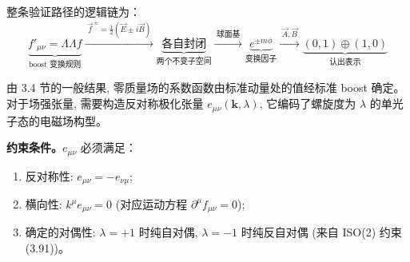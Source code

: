 整条验证路径的逻辑链为：
\begin{equation*}
    \underbrace{f'_{\mu\nu}=\Lambda\Lambda f}_{\text{boost 变换规则}}
    \xrightarrow{\;\vec{f}^{\,\pm}=\frac{1}{2}(\vec{E}\pm i\vec{B})\;}
    \underbrace{\text{各自封闭}}_{\text{两个不变子空间}}
    \xrightarrow{\;\text{球面基}\;}
    \underbrace{e^{\pm m\phi}}_{\text{变换因子}}
    \xrightarrow{\;\vec{A},\vec{B}\;}
    \underbrace{(0,1)\oplus(1,0)}_{\text{认出表示}}
\end{equation*}



由 3.4 节的一般结果, 零质量场的系数函数由标准动量处的值经标准 boost 确定。
对于场强张量, 需要构造反对称极化张量 $e_{\mu\nu}(\mathbf{k},\lambda)$,
它编码了螺旋度为 $\lambda$ 的单光子态的电磁场构型。

\textbf{约束条件。}$e_{\mu\nu}$ 必须满足：
\begin{enumerate}
    \item 反对称性: $e_{\mu\nu}=-e_{\nu\mu}$;
    \item 横向性: $k^\mu e_{\mu\nu}=0$ (对应运动方程 $\partial^\mu f_{\mu\nu}=0$);
    \item 确定的对偶性: $\lambda=+1$ 时纯自对偶, $\lambda=-1$ 时纯反自对偶
    (来自 ISO(2) 约束 (3.91))。
\end{enumerate}

